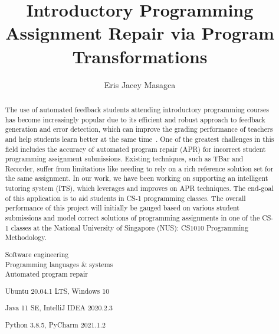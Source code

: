\documentclass[fyp,12pt]{socreport}
\newcommand{\itab}[1]{\hspace{0em}\rlap{#1}}
\newcommand{\tab}[1]{\hspace{.11\textwidth}\rlap{#1}}
\begin{document}

\title{Introductory Programming Assignment Repair via Program Transformations}
\author{Eris Jacey Masagca}
\deliverables{
    \item \itab{Report:} \tab{1 Volume}
}
\maketitle

\begin{abstract}

The use of automated feedback students attending introductory programming courses has become
increasingly popular due to its efficient and robust approach to feedback generation and error
detection, which can improve the grading performance of teachers and help students learn better
at the same time~\cite{haldeman2021automated}.
One of the greatest challenges in this field includes the accuracy of automated program repair (APR)
for incorrect student programming assignment submissions.
Existing techniques, such as TBar and Recorder, suffer from limitations like needing to rely on
a rich reference solution set for the same assignment.
In our work, we have been working on supporting an intelligent tutoring system (ITS), which
leverages and improves on APR techniques.
The end-goal of this application is to aid students in CS-1 programming classes.
The overall performance of this project will initially be gauged based on various student submissions
and model correct solutions of programming assignments in one of the CS-1 classes at the National
University of Singapore (NUS): CS1010 Programming Methodology.

\begin{descriptors} %
    \item \itab{TODO}	\tab{TODO}
\end{descriptors}
\begin{keywords}
    Software engineering \\
    Programming languages \& systems \\
    Automated program repair
\end{keywords}

\begin{implement}
    \item{Ubuntu 20.04.1 LTS, Windows 10}
    \item{Java 11 SE, IntelliJ IDEA 2020.2.3}
    \item{Python 3.8.5, PyCharm 2021.1.2}
\end{implement}

\end{abstract}
\end{document}

